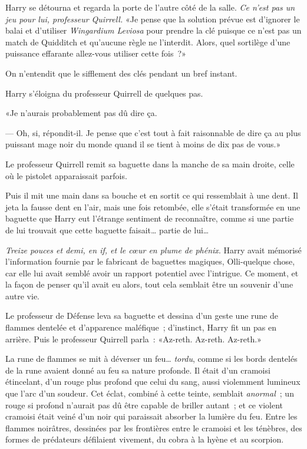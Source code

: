 Harry se détourna et regarda la porte de l'autre côté de la salle. \emph{Ce n'est pas un jeu pour lui, professeur Quirrell.} «Je pense que la solution prévue est d'ignorer le balai et d'utiliser \emph{Wingardium Leviosa} pour prendre la clé puisque ce n'est pas un match de Quidditch et qu'aucune règle ne l'interdit. Alors, quel sortilège d'une puissance effarante allez-vous utiliser cette fois~?»

On n'entendit que le sifflement des clés pendant un bref instant.

Harry s'éloigna du professeur Quirrell de quelques pas.

«Je n'aurais probablement pas dû dire ça.

--- Oh, si, répondit-il. Je pense que c'est tout à fait raisonnable de dire ça au plus puissant mage noir du monde quand il se tient à moins de dix pas de vous.»

Le professeur Quirrell remit sa baguette dans la manche de sa main droite, celle où le pistolet apparaissait parfois.

Puis il mit une main dans sa bouche et en sortit ce qui ressemblait à une dent. Il jeta la fausse dent en l'air, mais une fois retombée, elle s'était transformée en une baguette que Harry eut l'étrange sentiment de reconnaître, comme si une partie de lui trouvait que cette baguette faisait… partie de lui…

\emph{Treize pouces et demi, en if, et le cœur en plume de phénix}. Harry avait mémorisé l'information fournie par le fabricant de baguettes magiques, Olli-quelque chose, car elle lui avait semblé avoir un rapport potentiel avec l'intrigue. Ce moment, et la façon de penser qu'il avait eu alors, tout cela semblait être un souvenir d'une autre vie.

Le professeur de Défense leva sa baguette et dessina d'un geste une rune de flammes dentelée et d'apparence maléfique~; d'instinct, Harry fit un pas en arrière. Puis le professeur Quirrell parla~: «Az-reth. Az-reth. Az-reth.»

La rune de flammes se mit à déverser un feu… \emph{tordu}, comme si les bords dentelés de la rune avaient donné au feu sa nature profonde. Il était d'un cramoisi étincelant, d'un rouge plus profond que celui du sang, aussi violemment lumineux que l'arc d'un soudeur. Cet éclat, combiné à cette teinte, semblait \emph{anormal}~; un rouge si profond n'aurait pas dû être capable de briller autant~; et ce violent cramoisi était veiné d'un noir qui paraissait absorber la lumière du feu. Entre les flammes noirâtres, dessinées par les frontières entre le cramoisi et les ténèbres, des formes de prédateurs défilaient vivement, du cobra à la hyène et au scorpion.

